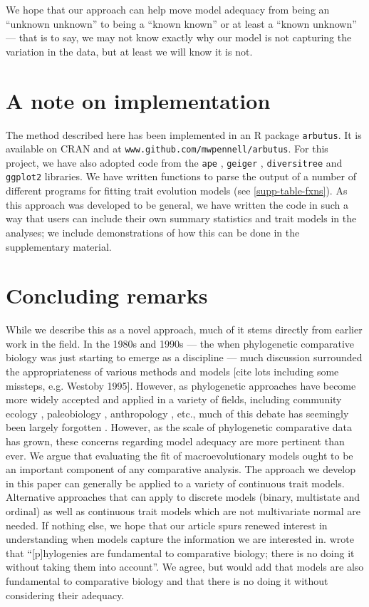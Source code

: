 \documentclass[a4paper,12pt]{article}
\begin{document}
We hope that our approach can help move model adequacy from being an ``unknown unknown''  to being a ``known known'' or at least a ``known unknown'' --- that is to say, we may not know exactly why our model is not capturing the variation in the data, but at least we will know it is not.


\section*{A note on implementation}

The method described here has been implemented in an R package \texttt{arbutus}. It is available on CRAN and at \texttt{www.github.com/mwpennell/arbutus}. For this project, we have also adopted code from the \texttt{ape} \citep{ape}, \texttt{geiger} \citep{geiger}, \texttt{diversitree} \citep{FitzJohn2012} and \texttt{ggplot2} \citep{ggplot2} libraries. We have written functions to parse the output of a number of different programs for fitting trait evolution models (see \ref{supp-table-fxns}). As this approach was developed to be general, we have written the code in such a way that users can include their own summary statistics and trait models in the analyses; we include demonstrations of how this can be done in the supplementary material.

\section*{Concluding remarks}

While we describe this as a novel approach, much of it stems directly from earlier work in the field. In the 1980s and 1990s --- the when phylogenetic comparative biology was just starting to emerge as a discipline --- much discussion surrounded the appropriateness of various methods and models [cite lots including some missteps, e.g. Westoby 1995]. However, as phylogenetic approaches have become more widely accepted and applied in a variety of fields, including community ecology \citep{Webb2002, CB2009, Mayfield2010, PennellHarmon}, paleobiology \citep{Hunt2012}, anthropology \citep{Nunnbook}, etc., much of this debate has seemingly been largely forgotten \citep[but see][]{Losos2011}. However, as the scale of phylogenetic comparative data has grown, these concerns regarding model adequacy are more pertinent than ever. We argue that evaluating the fit of macroevolutionary models ought to be an important component of any comparative analysis. The approach we develop in this paper can generally be applied to a variety of continuous trait models. Alternative approaches that can apply to discrete models (binary, multistate and ordinal) as well as continuous trait models which are not multivariate normal are needed. If nothing else, we hope that our article spurs renewed interest in understanding when models capture the information we are interested in. \citet[][p. 14]{Felsenstein1985} wrote that ``[p]hylogenies are fundamental to comparative biology; there is no doing it without taking them into account''. We agree, but would add that models are also fundamental to comparative biology and that there is no doing it without considering their adequacy.
\end{document}

